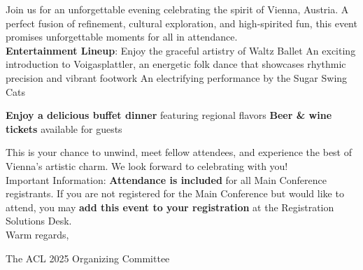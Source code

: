 Join us for an unforgettable evening celebrating the spirit of Vienna, Austria. A perfect fusion of refinement, cultural exploration, and high-spirited fun, this event promises unforgettable moments for all in attendance.\\

\textbf{Entertainment Lineup}:
Enjoy the graceful artistry of Waltz Ballet
An exciting introduction to Voigasplattler, an energetic folk dance that showcases rhythmic precision and vibrant footwork
An electrifying performance by the Sugar Swing Cats

\textbf{Enjoy a delicious buffet dinner} featuring regional flavors
\textbf{Beer & wine tickets} available for guests

This is your chance to unwind, meet fellow attendees, and experience the best of Vienna’s artistic charm. We look forward to celebrating with you!\\

Important Information:
\textbf{Attendance is included} for all Main Conference registrants.
If you are not registered for the Main Conference but would like to attend, you may \textbf{add this event to your registration} at the Registration Solutions Desk.\\

Warm regards,

The ACL 2025 Organizing Committee
